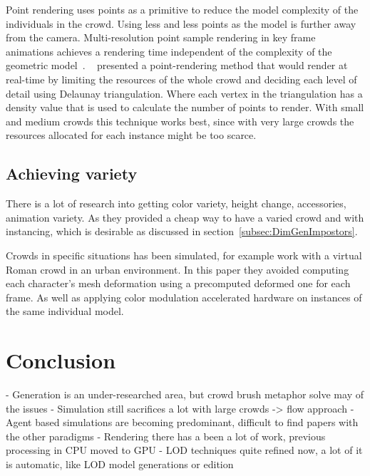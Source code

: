 \documentclass[11pt]{article}
\begin{document}
\begin{multicols}{2}
Point rendering uses points as a primitive to reduce the model complexity of the individuals in the crowd.
Using less and less points as the model is further away from the camera.
Multi-resolution point sample rendering in key frame animations achieves a rendering time independent of the complexity of the geometric model~\cite{Wand2002}.
~\cite{Larkin2010} presented a point-rendering method that would render at real-time by limiting the resources of the whole crowd and deciding each level of detail using Delaunay triangulation. 
Where each vertex in the triangulation has a density value that is used to calculate the number of points to render.
With small and medium crowds this technique works best, since with very large crowds the resources allocated for each instance might be too scarce.

\subsection{Achieving variety}

There is a lot of research into getting color variety, height change, accessories, animation variety.
As they provided a cheap way to have a varied crowd and with instancing, which is desirable as discussed in section~\ref{subsec:DimGenImpostors}.

Crowds in specific situations has been simulated, for example \cite{deHeras2005} work with a virtual Roman crowd in an urban environment.
In this paper they avoided computing each character’s mesh deformation using a precomputed deformed one for each frame.
As well as applying color modulation accelerated hardware on instances of the same individual model.

\section{Conclusion}

- Generation is an under-researched area, but crowd brush metaphor solve may of the issues
- Simulation still sacrifices a lot with large crowds -> flow approach
- Agent based simulations are becoming predominant, difficult to find papers with the other paradigms
- Rendering there has a been a lot of work, previous processing in CPU moved to GPU
- LOD techniques quite refined now, a lot of it is automatic, like LOD model generations or edition

%


\end{multicols}
\end{document}
